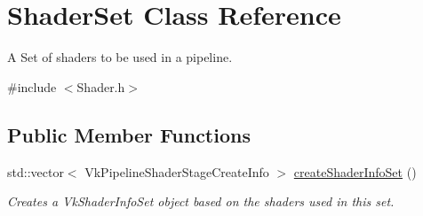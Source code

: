 \hypertarget{struct_shader_set}{}\section{Shader\+Set Class Reference}
\label{struct_shader_set}


A Set of shaders to be used in a pipeline.  




{\ttfamily \#include $<$Shader.\+h$>$}

\subsection*{Public Member Functions}
\begin{DoxyCompactItemize}
\item 
\mbox{\label{struct_shader_set_a47ae8e4def7b8ca54b395b9beb276cd6}} 
std\+::vector$<$ Vk\+Pipeline\+Shader\+Stage\+Create\+Info $>$ \mbox{\hyperlink{struct_shader_set_a47ae8e4def7b8ca54b395b9beb276cd6}{create\+Shader\+Info\+Set}} ()
\begin{DoxyCompactList}\small\item\em Creates a Vk\+Shader\+Info\+Set object based on the shaders used in this set. \end{DoxyCompactList}\end{DoxyCompactItemize}
